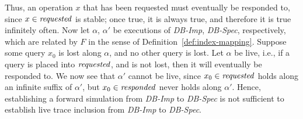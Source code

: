 \documentclass[11pt]{article}
\newcommand{\al}{\alpha}
\newcommand{\ms}[1]{\relax\ifmmode
                \mathord{\mathcode`\-="702D\it #1\mathcode`\-="2200}\else
{\it #1}\fi
}
\newcommand{\statevar}[1]{\ms{#1}}
\newcommand{\dbspec}{\textit{DB-Spec}\xspace}
\newcommand{\dbimp}{\textit{DB-Imp}\xspace}
\newcommand{\requested}{\statevar{requested}}
\newcommand{\responded}{\statevar{responded}}
\begin{document}
Thus, an operation $x$ that has been requested must eventually be
responded to, since ${x \in \requested}$ is stable; once true, it is
always true, and therefore it is true infinitely often.
Now let $\al$, $\al'$ be executions of \dbimp,
\dbspec, respectively, which are related by $F$ in
the sense of Definition~\ref{def:index-mapping}. Suppose some query $x_0$ is
lost along $\al$, and no other query is lost. Let $\al$ be live, i.e., 
if a query is placed into $\requested$, and is not lost, then it will
eventually be responded to. We now see that $\al'$ cannot be
live, since $x_0 \in \requested$ holds along an infinite suffix of $\al'$, but 
$x_0 \in \responded$ never holds along $\al'$.
Hence, establishing a forward simulation from 
\dbimp to \dbspec is not sufficient to 
establish live trace inclusion from 
\dbimp to \dbspec.
\end{document}
